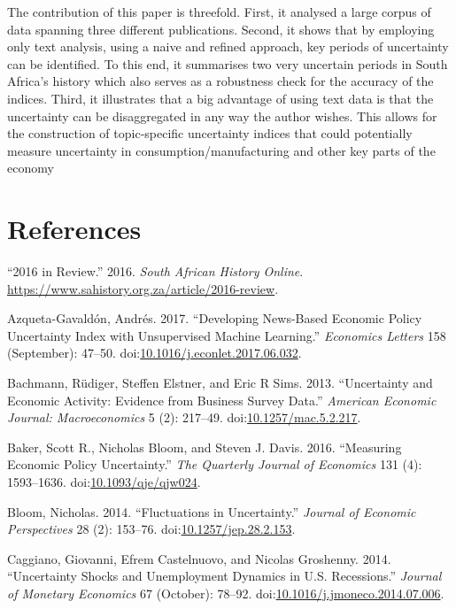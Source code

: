 \documentclass[11pt,preprint, authoryear]{elsarticle}
\numberwithin{equation}{section}
\numberwithin{figure}{section}
\numberwithin{table}{section}
\begin{document}
The contribution of this paper is threefold. First, it analysed a large corpus of data spanning three different publications. Second, it shows that by employing only text analysis, using a naive and refined approach, key periods of uncertainty can be identified. To this end, it summarises two very uncertain periods in South Africa's history which also serves as a robustness check for the accuracy of the indices. Third, it illustrates that a big advantage of using text data is that the uncertainty can be disaggregated in any way the author wishes. This allows for the construction of topic-specific uncertainty indices that could potentially measure uncertainty in consumption/manufacturing and other key parts of the economy


\newpage

\section*{References}\label{references}

\hypertarget{refs}{}
\hypertarget{ref-2016}{}
``2016 in Review.'' 2016. \emph{South African History Online}.
\url{https://www.sahistory.org.za/article/2016-review}.

\hypertarget{ref-Azqueta-Gavaldon2017}{}
Azqueta-Gavaldón, Andrés. 2017. ``Developing News-Based Economic Policy
Uncertainty Index with Unsupervised Machine Learning.'' \emph{Economics
Letters} 158 (September): 47--50.
doi:\href{https://doi.org/10.1016/j.econlet.2017.06.032}{10.1016/j.econlet.2017.06.032}.

\hypertarget{ref-Bachmann2013}{}
Bachmann, Rüdiger, Steffen Elstner, and Eric R Sims. 2013. ``Uncertainty
and Economic Activity: Evidence from Business Survey Data.''
\emph{American Economic Journal: Macroeconomics} 5 (2): 217--49.
doi:\href{https://doi.org/10.1257/mac.5.2.217}{10.1257/mac.5.2.217}.

\hypertarget{ref-Baker2016}{}
Baker, Scott R., Nicholas Bloom, and Steven J. Davis. 2016. ``Measuring
Economic Policy Uncertainty.'' \emph{The Quarterly Journal of Economics}
131 (4): 1593--1636.
doi:\href{https://doi.org/10.1093/qje/qjw024}{10.1093/qje/qjw024}.

\hypertarget{ref-Bloom2014}{}
Bloom, Nicholas. 2014. ``Fluctuations in Uncertainty.'' \emph{Journal of
Economic Perspectives} 28 (2): 153--76.
doi:\href{https://doi.org/10.1257/jep.28.2.153}{10.1257/jep.28.2.153}.

\hypertarget{ref-Caggiano2014}{}
Caggiano, Giovanni, Efrem Castelnuovo, and Nicolas Groshenny. 2014.
``Uncertainty Shocks and Unemployment Dynamics in U.S. Recessions.''
\emph{Journal of Monetary Economics} 67 (October): 78--92.
doi:\href{https://doi.org/10.1016/j.jmoneco.2014.07.006}{10.1016/j.jmoneco.2014.07.006}.
\end{document}
